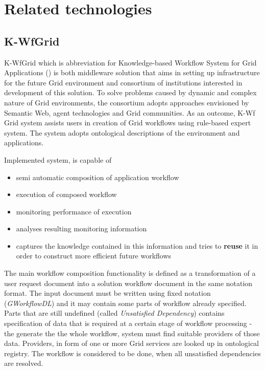 %
 
 
\section{Related technologies}




\subsection{K-WfGrid}
\label{ssec:kwfgrid}

K-WfGrid which is abbreviation for Knowledge-based Workflow System for Grid Applications (\cite{KWfGrid1, flow-cgw04, wct-kwf-book-07}) is both middleware solution that aims in setting up infrastructure for the future Grid environment and consortium of institutions interested in development of this solution. To solve problems caused by dynamic and complex nature of Grid environments, the consortium adopts approaches envisioned by Semantic Web, agent technologies and Grid communities. As an outcome, K-Wf Grid system assists users in creation of Grid workflows using rule-based expert system.
The system adopts ontological descriptions of the environment and applications. 

Implemented system, is capable of
\begin{itemize}
  \item{semi automatic composition of application workflow}
  \item{execution of composed workflow}
  \item{monitoring performance of execution}
  \item{analyses resulting monitoring information}
  \item{captures the knowledge contained in this information and tries to {\bf reuse} it in order to construct more efficient future workflows}
\end{itemize}

The main workflow composition functionality is defined as a transformation of a user request document into a solution workflow document in the same notation format. The input document must be written using fixed notation (\emph{GWorkflowDL}) and it may contain some parts of workflow already specified. Parts that are still undefined (called \emph{Unsatisfied Dependency}) contains specification of data that is required at a certain stage of workflow processing - the generate the the whole workflow, system must find suitable providers of those data. Providers, in form of one or more Grid services are looked up in ontological registry. The workflow is considered to be done, when all unsatisfied dependencies are resolved.


